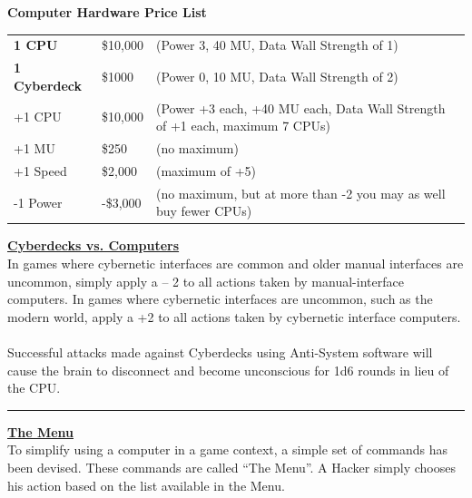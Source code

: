 \documentclass[11pt,twoside,a4paper]{article}
\begin{document}
\begin{multicols*}{2}
\textbf{Computer Hardware Price List }
\begin{center}
	\begin{tabular}[ht]{ p{3.00cm} p{2.00cm} p{12.00cm} }
		\textbf{1 CPU}			&	\$10,000	&	(Power 3, 40 MU, Data Wall Strength of 1)										\\
		\textbf{1 Cyberdeck}	&	\$1000		&	(Power 0, 10 MU, Data Wall Strength of 2)										\\
		+1 CPU					&	\$10,000	&	(Power +3 each, +40 MU each, Data Wall Strength of +1 each, maximum 7 CPUs)		\\
		+1 MU					&	\$250		&	(no maximum)																	\\
		+1 Speed				&	\$2,000		&	(maximum of +5)																	\\
		-1 Power				&	-\$3,000	&	(no maximum, but at more than -2 you may as well buy fewer CPUs)				\\
	\end{tabular}
\end{center}

\textbf{\underline{\large Cyberdecks vs. Computers}}~\\

In games where cybernetic interfaces are common and older manual interfaces are uncommon, simply apply a -- 2 to all actions taken by manual-interface computers. In games where cybernetic interfaces are uncommon, such as the modern world, apply a +2 to all actions taken by cybernetic interface computers. ~\\

Successful attacks made against Cyberdecks using Anti-System software will cause the brain to disconnect and become unconscious for 1d6 rounds in lieu of the CPU. ~\\

\begin{center} \rule{0.45\textwidth}{0.01cm} \end{center}

\textbf{\underline{\large The Menu}}~\\

To simplify using a computer in a game context, a simple set of commands has been devised. These commands
are called ``The Menu''. A Hacker simply chooses his action based on the list available in the Menu. ~\\


\end{multicols*}
\end{document}
